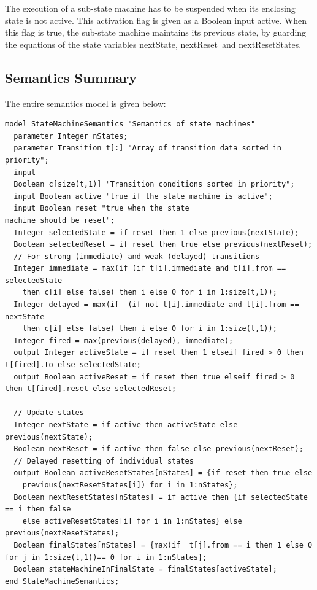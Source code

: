 \documentclass[10pt,a4paper]{report}
\def\doublelabel#1{\label{#1}}
\begin{document}
The execution of a sub-state machine has to be suspended when its
enclosing state is not active. This activation flag is given as a
Boolean input active. When this flag is true, the sub-state machine
maintains its previous state, by guarding the equations of the state
variables nextState, nextReset~and nextResetStates.

\subsection{Semantics Summary}\doublelabel{semantics-summary}

The entire semantics model is given below:

\begin{lstlisting}[language=modelica]
model StateMachineSemantics "Semantics of state machines"
  parameter Integer nStates;
  parameter Transition t[:] "Array of transition data sorted in priority";
  input
  Boolean c[size(t,1)] "Transition conditions sorted in priority";
  input Boolean active "true if the state machine is active";
  input Boolean reset "true when the state
machine should be reset";
  Integer selectedState = if reset then 1 else previous(nextState);
  Boolean selectedReset = if reset then true else previous(nextReset);
  // For strong (immediate) and weak (delayed) transitions
  Integer immediate = max(if (if t[i].immediate and t[i].from == selectedState 
    then c[i] else false) then i else 0 for i in 1:size(t,1));
  Integer delayed = max(if  (if not t[i].immediate and t[i].from == nextState 
    then c[i] else false) then i else 0 for i in 1:size(t,1));
  Integer fired = max(previous(delayed), immediate);
  output Integer activeState = if reset then 1 elseif fired > 0 then t[fired].to else selectedState;
  output Boolean activeReset = if reset then true elseif fired > 0 then t[fired].reset else selectedReset;
  
  // Update states
  Integer nextState = if active then activeState else previous(nextState);
  Boolean nextReset = if active then false else previous(nextReset);
  // Delayed resetting of individual states
  output Boolean activeResetStates[nStates] = {if reset then true else 
    previous(nextResetStates[i]) for i in 1:nStates};
  Boolean nextResetStates[nStates] = if active then {if selectedState == i then false 
    else activeResetStates[i] for i in 1:nStates} else previous(nextResetStates);
  Boolean finalStates[nStates] = {max(if  t[j].from == i then 1 else 0 for j in 1:size(t,1))== 0 for i in 1:nStates};
  Boolean stateMachineInFinalState = finalStates[activeState];
end StateMachineSemantics;
\end{lstlisting}
\end{document}
